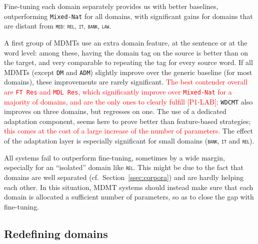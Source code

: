 \documentclass[11pt,a4paper]{article}
\newcommand{\fyDone}[1]{\done[FY]\Todo[FY:]{\textcolor{orange}{#1}}}
\newcommand{\revision}[1]{\textcolor{red}{#1}}
\newcommand{\domain}[1]{\texttt{\textsc{#1}}}
\newcommand{\system}[1]{\texttt{{#1}}}
\begin{document}
Fine-tuning each domain separately provides us with better baselines, outperforming \system{Mixed-Nat} for all domains, with significant gains for domains that are distant from \domain{med}: \domain{rel}, \domain{it}, \domain{bank}, \domain{law}.
\fyDone{Add 2 averages ?}\fyDone{Significance testing wrt Mix Generic, Full Fine-tuned, for each domain}

A  first group of MDMTs use an extra domain feature, at the sentence or at the word level: among these, having the domain tag on the source is better than on the target, and very comparable to repeating the tag for every source word. If all MDMTs (except \system{DM} and \system{ADM}) slightly improve over the generic baseline (for most domains), these improvements are rarely significant. \revision{The best contender overall are  \system{FT Res} and \system{MDL Res}, which significantly improve over \system{Mixed-Nat} for a majority of domains, and are the only ones to clearly fulfill [P1-LAB];} \system{WDCMT} also improves on three domains, but regresses on one. The use of a dedicated adaptation component, seems here to prove better than feature-based strategies; \revision{this comes at the cost of a large increase of the number of parameters.} The effect of the adaptation layer is especially significant for small domains (\domain{bank}, \domain{it} and \domain{rel}).

All systems fail to outperform fine-tuning, sometimes by a wide margin, especially for an ``isolated'' domain like \domain{rel}. This might be due to the fact that domains are well separated (cf.\ Section~\ref{ssec:corpora}) and are hardly helping each other. In this situation, MDMT systems should instead make sure that each domain is allocated a sufficient number of parameters, so as to close the gap with fine-tuning.
\fyDone{More comments when we have all the results}\fyDone{Importance of sharing and unsharing}


\subsection{Redefining domains \label{ssec:redomains}}
\end{document}
